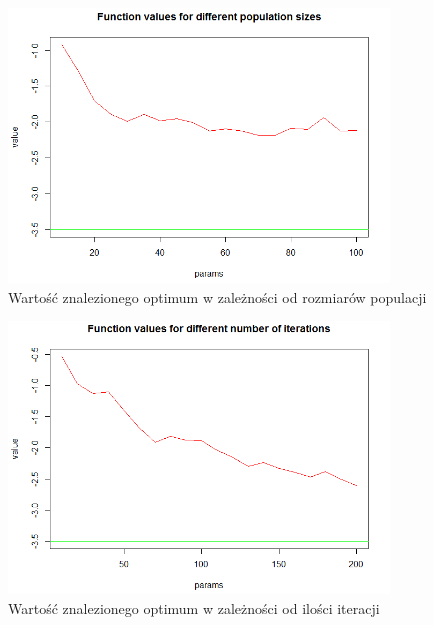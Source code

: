 \documentclass[11pt, a4paper]{article}
\begin{document}
\begin{figure}[H]
	\begin{center}
		\includegraphics[width=0.9\textwidth]{./assets/Zeldasine5.png} %
		\caption{Wartość znalezionego optimum w zależności od rozmiarów populacji}
		\label{fig:zeldasine5}
	\end{center}
\end{figure}

\begin{figure}[H]
	\begin{center}
		\includegraphics[width=0.9\textwidth]{./assets/Zeldasine6.png} %
		\caption{Wartość znalezionego optimum w zależności od ilości iteracji}
		\label{fig:zeldasine6}
	\end{center}
\end{figure}
\end{document}
